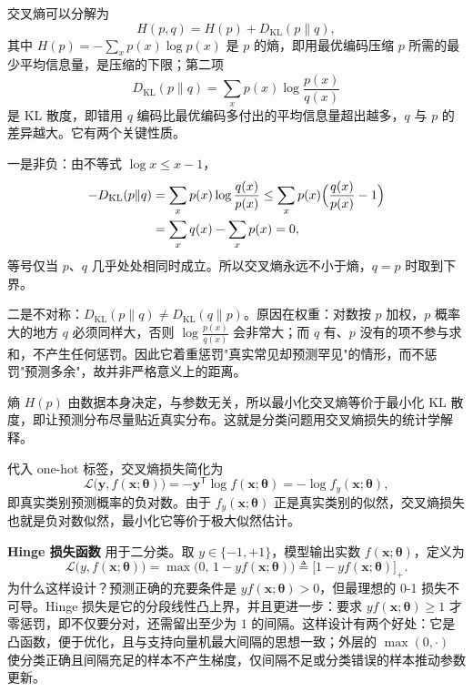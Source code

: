 \documentclass[UTF8,a4paper,12pt]{ctexart}
\numberwithin{equation}{section}
\begin{document}
交叉熵可以分解为
\begin{equation}\label{eq:2.5}
H(p,q)=H(p)+D_{\mathrm{KL}}(p\|q),
\end{equation}
其中 $H(p)=-\sum_{x}p(x)\log p(x)$ 是 $p$ 的熵，即用最优编码压缩 $p$ 所需的最少平均信息量，是压缩的下限；第二项
\begin{equation}\label{eq:2.6}
D_{\mathrm{KL}}(p\|q)=\sum_{x}p(x)\log\frac{p(x)}{q(x)}
\end{equation}
是 KL 散度，即错用 $q$ 编码比最优编码多付出的平均信息量超出越多，$q$ 与 $p$ 的差异越大。它有两个关键性质。

一是非负：由不等式 $\log x\le x-1$，
\begin{equation}\label{eq:2.7}
\begin{aligned}
-D_{\mathrm{KL}}(p\|q)
&=\sum_{x}p(x)\log\frac{q(x)}{p(x)}
\le\sum_{x}p(x)\Bigl(\frac{q(x)}{p(x)}-1\Bigr)\\
&=\sum_{x}q(x)-\sum_{x}p(x)=0,
\end{aligned}
\end{equation}
等号仅当 $p$、$q$ 几乎处处相同时成立。所以交叉熵永远不小于熵，$q=p$ 时取到下界。

二是不对称：$D_{\mathrm{KL}}(p\|q)\ne D_{\mathrm{KL}}(q\|p)$。原因在权重：对数按 $p$ 加权，$p$ 概率大的地方 $q$ 必须同样大，否则 $\log\frac{p(x)}{q(x)}$ 会非常大；而 $q$ 有、$p$ 没有的项不参与求和，不产生任何惩罚。因此它着重惩罚"真实常见却预测罕见"的情形，而不惩罚"预测多余"，故并非严格意义上的距离。

熵 $H(p)$ 由数据本身决定，与参数无关，所以最小化交叉熵等价于最小化 KL 散度，即让预测分布尽量贴近真实分布。这就是分类问题用交叉熵损失的统计学解释。

代入 one-hot 标签，交叉熵损失简化为
\begin{equation}\label{eq:2.8}
\mathcal{L}\bigl(\bm{y},f(\bm{x};\bm{\theta})\bigr)
=-\bm{y}^{\mathsf{T}}\log f(\bm{x};\bm{\theta})
=-\log f_y(\bm{x};\bm{\theta}),
\end{equation}
即真实类别预测概率的负对数。由于 $f_y(\bm{x};\bm{\theta})$ 正是真实类别的似然，交叉熵损失也就是负对数似然，最小化它等价于极大似然估计。

\noindent\textbf{Hinge 损失函数} 用于二分类。取 $y\in\{-1,+1\}$，模型输出实数 $f(\bm{x};\bm{\theta})$，定义为
\begin{equation}\label{eq:2.9}
\mathcal{L}\bigl(y,f(\bm{x};\bm{\theta})\bigr)
=\max\bigl(0,\,1-yf(\bm{x};\bm{\theta})\bigr)
\triangleq\bigl[1-yf(\bm{x};\bm{\theta})\bigr]_{+}.
\end{equation}
为什么这样设计？预测正确的充要条件是 $yf(\bm{x};\bm{\theta})>0$，但最理想的 0-1 损失不可导。Hinge 损失是它的分段线性凸上界，并且更进一步：要求 $yf(\bm{x};\bm{\theta})\ge 1$ 才零惩罚，即不仅要分对，还需留出至少为 $1$ 的间隔。这样设计有两个好处：它是凸函数，便于优化，且与支持向量机最大间隔的思想一致；外层的 $\max(0,\cdot)$ 使分类正确且间隔充足的样本不产生梯度，仅间隔不足或分类错误的样本推动参数更新。
\end{document}
